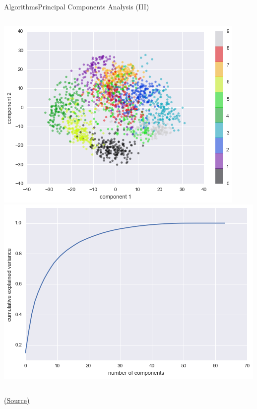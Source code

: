 \documentclass[10pt,compress]{beamer} %
\begin{document}
\begin{frame}{Algorithms}{Principal Components Analysis (III)}
    \begin{columns}
			\includegraphics[width=\linewidth]{figs/handdigitspca.png}
			\includegraphics[width=\linewidth]{figs/pcacomponents.png}
    \end{columns}

   	\centering \tiny{\href{https://github.com/amueller/introduction_to_ml_with_python/blob/master/03-unsupervised-learning.ipynb}{(Source)}}
\end{frame}
\end{document}
